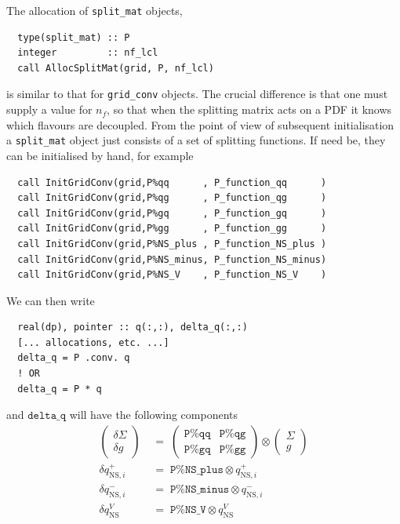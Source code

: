 \documentclass[12pt]{article}
\newcommand{\ttt}[1]{\texttt{#1}}
\begin{document}
The allocation of \ttt{split\_mat} objects,
\begin{lstlisting}
  type(split_mat) :: P
  integer         :: nf_lcl
  call AllocSplitMat(grid, P, nf_lcl)
\end{lstlisting}
is similar to that for \ttt{grid\_conv} objects. The crucial difference is
that one must supply a value for $n_f$, so that when the splitting
matrix acts on a PDF it knows which flavours are decoupled. From the
point of view of subsequent initialisation a \ttt{split\_mat} object
just consists of a set of splitting functions. 
If need be, they can be
initialised by hand, for example
\begin{lstlisting}
  call InitGridConv(grid,P%qq      , P_function_qq      )
  call InitGridConv(grid,P%qg      , P_function_qg      )
  call InitGridConv(grid,P%gq      , P_function_gq      )
  call InitGridConv(grid,P%gg      , P_function_gg      )
  call InitGridConv(grid,P%NS_plus , P_function_NS_plus )
  call InitGridConv(grid,P%NS_minus, P_function_NS_minus)
  call InitGridConv(grid,P%NS_V    , P_function_NS_V    )
\end{lstlisting}
We can then write
\begin{lstlisting}
  real(dp), pointer :: q(:,:), delta_q(:,:)
  [... allocations, etc. ...]
  delta_q = P .conv. q
  ! OR
  delta_q = P * q
\end{lstlisting}
and $\ttt{delta\_q}$ will have the following components
\begin{align}
  \label{eq:Pmat_on_q}
  \left(\!\!
    \begin{array}{c}
      \delta\Sigma\\
       \delta g
    \end{array}
  \!\!\right)
    \;&= \;
  \left(
    \begin{array}{cc}
      \ttt{P\%qq} & \ttt{P\%qg}\\
      \ttt{P\%gq} & \ttt{P\%gg}
    \end{array}
  \right) 
  \otimes
  \left(\!\!
    \begin{array}{c}
      \Sigma\\
       g
    \end{array}
    \!\!\right) 
  \nonumber\\[3pt]
%
  \delta q^+_{\mathrm{NS},i} \;&=\; \ttt{P\%NS\_plus} \otimes
  q^+_{\mathrm{NS},i}\\[3pt] 
%
  \delta q^-_{\mathrm{NS},i} \;&=\; \ttt{P\%NS\_minus} \otimes
  q^-_{\mathrm{NS},i}\nonumber \\[3pt]
% 
  \delta q^V_{\mathrm{NS}} \;&=\; \ttt{P\%NS\_V} \otimes
  q^V_{\mathrm{NS}} \nonumber
\end{align}
\end{document}
